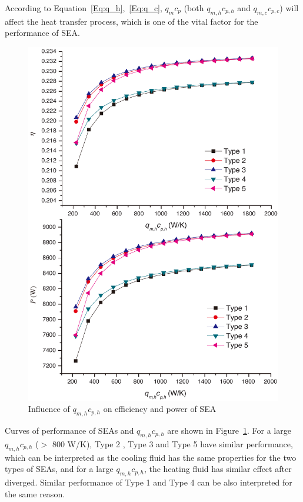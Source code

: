 According to Equation~\ref{Eq:q_h},~\ref{Eq:q_c}, $q_mc_p$ (both $q_{m,h}c_{p,h}$ and $q_{m,c}c_{p,c}$) will affect the heat transfer process, which is one of the vital factor for the performance of SEA.


\noindent \begin{figure}[htbp]
\begin{center}
	\includegraphics[width = 0.7\columnwidth]{./fig/qm_hcp_h}
	\caption{Influence of $q_{m,h}c_{p,h}$ on efficiency and power of SEA}
	\label{fig:qm_hcp_h}
\end{center}
\end{figure}

Curves of performance of SEAs and $q_{m,h}c_{p,h}$ are shown in Figure~\ref{fig:qm_hcp_h}.
For a large $q_{m,h}c_{p,h}$ ($>$ 800 W/K), Type 2 , Type 3 and Type 5 have similar performance, which can be interpreted as the cooling fluid has the same properties for the two types of SEAs, and for a large $q_{m,h}c_{p,h}$, the heating fluid has similar effect after diverged. Similar performance of Type 1 and Type 4 can be also interpreted for the same reason.

